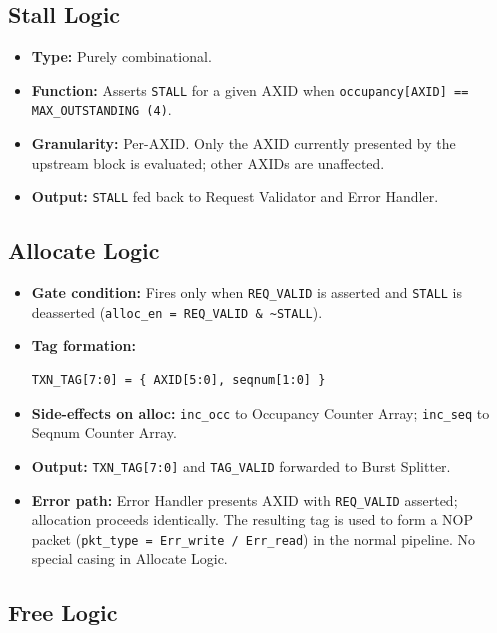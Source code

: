 \subsection{Stall Logic}

\begin{itemize}
  \item \textbf{Type:} Purely combinational.
  \item \textbf{Function:} Asserts \texttt{STALL} for a given AXID when
        \texttt{occupancy[AXID] == MAX\_OUTSTANDING (4)}.
  \item \textbf{Granularity:} Per-AXID. Only the AXID currently
        presented by the upstream block is evaluated; other AXIDs are
        unaffected.
  \item \textbf{Output:} \texttt{STALL} fed back to Request Validator
        and Error Handler.
\end{itemize}

\subsection{Allocate Logic}

\begin{itemize}
  \item \textbf{Gate condition:} Fires only when \texttt{REQ\_VALID}
        is asserted and \texttt{STALL} is deasserted
        (\texttt{alloc\_en = REQ\_VALID \& \textasciitilde{}STALL}).
  \item \textbf{Tag formation:}
\begin{lstlisting}
TXN_TAG[7:0] = { AXID[5:0], seqnum[1:0] }
\end{lstlisting}
  \item \textbf{Side-effects on alloc:}
        \texttt{inc\_occ} to Occupancy Counter Array;
        \texttt{inc\_seq} to Seqnum Counter Array.
  \item \textbf{Output:} \texttt{TXN\_TAG[7:0]} and \texttt{TAG\_VALID}
        forwarded to Burst Splitter.
  \item \textbf{Error path:} Error Handler presents AXID with
        \texttt{REQ\_VALID} asserted; allocation proceeds identically.
        The resulting tag is used to form a NOP packet
        (\texttt{pkt\_type = Err\_write / Err\_read}) in the normal
        pipeline. No special casing in Allocate Logic.
\end{itemize}

\subsection{Free Logic}

